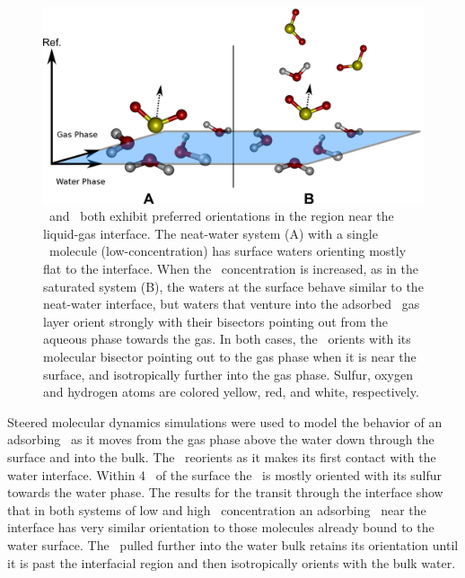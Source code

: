 \documentclass{article}
\begin{document}
\begin{figure}[h!]
	\begin{center}
		\includegraphics[scale=1.0]{system-surface.png}
		\caption{\wat~and \suldiox~both exhibit preferred orientations in the region near the liquid-gas interface. The neat-water system (A) with a single \suldiox~molecule (low-concentration) has surface waters orienting mostly flat to the interface. When the \suldiox~concentration is increased, as in the saturated system (B), the waters at the surface behave similar to the neat-water interface, but waters that venture into the adsorbed \suldiox~gas layer orient strongly with their bisectors pointing out from the aqueous phase towards the gas. In both cases, the \suldiox~orients with its molecular bisector pointing out to the gas phase when it is near the surface, and isotropically further into the gas phase. Sulfur, oxygen and hydrogen atoms are colored yellow, red, and white, respectively.}
		\label{fig:so2-surface-cartoon}
	\end{center}
\end{figure}

Steered molecular dynamics simulations were used to model the behavior of an adsorbing \suldiox~as it moves from the gas phase above the water down through the surface and into the bulk. The \suldiox~reorients as it makes its first contact with the water interface. Within 4 \angs~of the surface the \suldiox~is mostly oriented with its sulfur towards the water phase. The results for the transit through the interface show that in both systems of low and high \suldiox~concentration an adsorbing \suldiox~near the interface has very similar orientation to those molecules already bound to the water surface. The \suldiox~pulled further into the water bulk retains its orientation until it is past the interfacial region and then isotropically orients with the bulk water.
\end{document}
